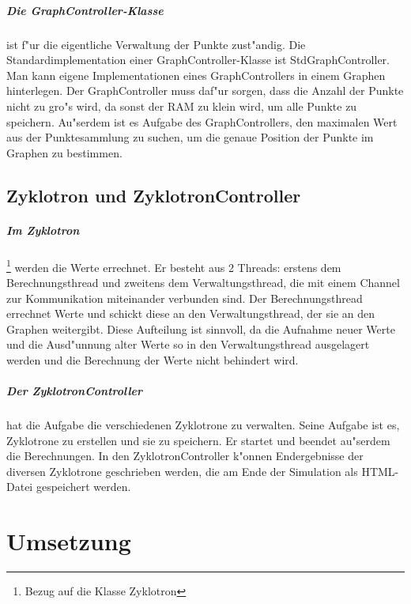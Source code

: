 \documentclass[14pt, a4paper]{report}
\begin{document}
\paragraph{Die GraphController-Klasse} ist f"ur die eigentliche Verwaltung der Punkte
zust"andig. Die Standardimplementation einer GraphController-Klasse ist 
StdGraphController. Man kann eigene Implementationen eines GraphControllers in einem
Graphen hinterlegen. Der GraphController muss daf"ur sorgen, dass die Anzahl der Punkte
nicht zu gro"s wird, da sonst der RAM zu klein wird, um alle Punkte zu speichern. 
Au"serdem ist es Aufgabe des GraphControllers, den maximalen Wert aus der Punktesammlung
zu suchen, um die genaue Position der Punkte im Graphen zu bestimmen. 

\section{Zyklotron und ZyklotronController}
\paragraph{Im Zyklotron} \footnote{Bezug auf die Klasse Zyklotron}
werden die Werte errechnet. Er besteht aus 2 Threads: erstens
dem Berechnungsthread und zweitens dem Verwaltungsthread, die mit einem Channel zur
Kommunikation miteinander verbunden sind. 
Der Berechnungsthread errechnet Werte und schickt diese an
den Verwaltungsthread, der sie an den Graphen weitergibt. Diese Aufteilung ist sinnvoll,
da die Aufnahme neuer Werte und die Ausd"unnung alter Werte so in den Verwaltungsthread
ausgelagert werden und die Berechnung der Werte nicht behindert wird.

\paragraph{Der ZyklotronController} hat die Aufgabe die verschiedenen Zyklotrone zu
verwalten. Seine Aufgabe ist es, Zyklotrone zu erstellen und sie zu speichern. Er startet und beendet
au"serdem die Berechnungen. In den ZyklotronController
k"onnen Endergebnisse der diversen Zyklotrone geschrieben werden, die am Ende der 
Simulation als HTML-Datei gespeichert werden.

\chapter{Umsetzung}
\end{document}
